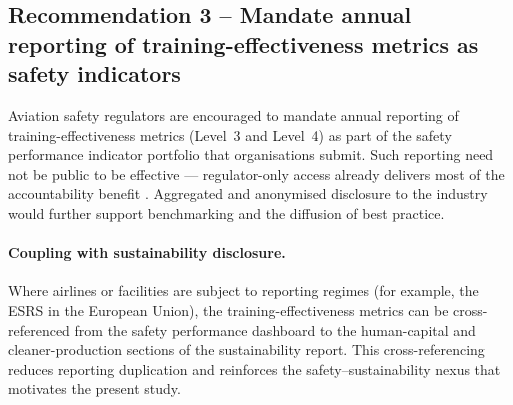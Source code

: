 \subsection{Recommendation 3 -- Mandate annual reporting of training-effectiveness metrics as safety indicators}
\label{subsec:pol-rec3}

Aviation safety regulators are encouraged to mandate annual reporting of
training-effectiveness metrics (Level~3 and Level~4) as part of the safety
performance indicator portfolio that organisations submit. Such reporting
need not be public to be effective --- regulator-only access already
delivers most of the accountability benefit \citep{FAA2024}. Aggregated and
anonymised disclosure to the industry would further support
benchmarking and the diffusion of best practice.

\paragraph{Coupling with sustainability disclosure.}
Where airlines or \MRO{} facilities are subject to \ESG{} reporting
regimes (for example, the ESRS in the European Union), the
training-effectiveness metrics can be cross-referenced from the safety
performance dashboard to the human-capital and cleaner-production sections
of the sustainability report. This cross-referencing reduces reporting
duplication and reinforces the safety--sustainability nexus that motivates
the present study.
